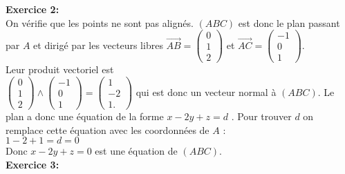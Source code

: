 \documentclass[a4paper, 10pt]{article}
\theoremstyle{plain}
\begin{document}
\bigskip
\noindent
\textbf{Exercice 2:}\\
On vérifie que les points ne sont pas alignés. $(ABC)$ est donc le plan passant par 
$A$ et dirigé par les vecteurs libres 
$\overrightarrow{AB}= \begin{pmatrix} 0 \\1 \\ 2 \end{pmatrix}$ et 
$ \overrightarrow{AC} = \begin{pmatrix} -1\\ 0 \\ 1\end{pmatrix}$.\\
Leur produit vectoriel est \\
$\begin{pmatrix} 0 \\1 \\ 2 \end{pmatrix} \wedge 
\begin{pmatrix} -1\\ 0 \\ 1\end{pmatrix}=
\begin{pmatrix} 1 \\ -2 \\ 1.\end{pmatrix}$ qui est donc un vecteur normal à $(ABC)$.
Le plan a donc une équation de la forme
$x -2y +z =d$ . Pour trouver $d$ on remplace cette équation avec les coordonnées de $A$ :\\
$1-2+1=d=0$\\
Donc $x -2y +z =0$ est une équation de $(ABC)$.
\vspace{0.4cm}
\\
\noindent
\textbf{Exercice 3:}\\
\end{document}
